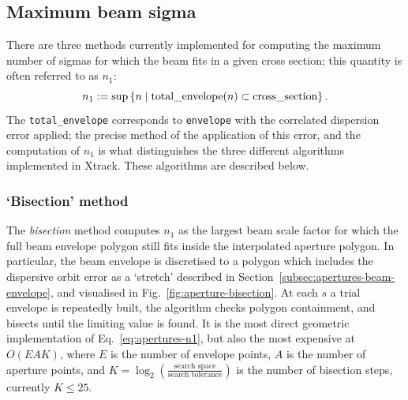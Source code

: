 \subsection{Maximum beam sigma}

There are three methods currently implemented for computing the maximum number of sigmas for which the beam fits in a given cross section; this quantity is often referred to as $n_1$:
\begin{equation}\label{eq:apertures-n1}
	n_1 := \sup \left\{ n \;|\; \text{\lstinline{total_envelope}}(n) \subset \text{\lstinline{cross_section}} \right\}.
\end{equation}
The \lstinline{total_envelope} corresponds to \lstinline{envelope} with the correlated dispersion error applied; the precise method of the application of this error, and the computation of $n_1$ is what distinguishes the three different algorithms implemented in Xtrack.
These algorithms are described below.

\subsubsection{`Bisection' method}

The \emph{bisection} method computes $n_1$ as the largest beam scale factor for which the full beam envelope polygon still fits inside the interpolated aperture polygon.
In particular, the beam envelope is discretised to a polygon which includes the dispersive orbit error as a `stretch' described in Section~\ref{subsec:apertures-beam-envelope}, and visualised in Fig.~\ref{fig:aperture-bisection}.
At each $s$ a trial envelope is repeatedly built, the algorithm checks polygon containment, and bisects until the limiting value is found.
It is the most direct geometric implementation of Eq.~\ref{eq:apertures-n1}, but also the most expensive at  $O(EAK)$, where $E$ is the number of envelope points,
              $A$ is the number of aperture points, and $K = \log_2(\frac{\text{search space}}{\text{search tolerance}})$ is the number of bisection steps, currently $K \leq 25$.

